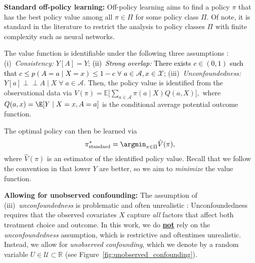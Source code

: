 \documentclass{article} %
\theoremstyle{plain}
\theoremstyle{definition}
\theoremstyle{remark}
\newcommand{\indep}{\perp \!\!\! \perp}
\newcommand{\rebuttal}[1]{\textcolor{black}{#1}}
\begin{document}
\textbf{Standard off-policy learning:} Off-policy learning aims to find a policy $\pi$ that has the best policy value among all $\pi \in \Pi$ for some policy class $\Pi$. Of note, it is standard in the literature \citep{ Frauen.2024, Hatt.2022b,Kallus.2018c} to restrict the analysis to policy classes $\Pi$ with finite complexity such as neural networks. 

The value function is identifiable under the following three assumptions \citep{Rubin.1978}: 
(i)~\emph{Consistency:} $Y[A]=Y$; \rebuttal{(ii)~\emph{Strong overlap:} There exists $c\in(0,1)$ such that $c \leq p(A=a \mid X=x)\leq 1-c \;\forall \; a\in \mathcal{A},x\in \mathcal{X}$;} (iii)~\emph{Unconfoundedness:} $Y[a]\indep A \mid X \;\forall \; a \in \mathcal{A}$. Then, the policy value is identified from the observational data via
   $V(\pi) = \mathbb{E}\Big[\sum_{a\in\mathcal{A}} \pi(a\mid X) Q(a,X)\Big],$
where $Q(a,x) = \E[Y \mid X=x, A = a]$ is the {conditional average potential outcome} function. 

The optimal policy can then be learned via
\begin{align}\label{eq:pstar_naive}
    \pi_{\text{standard}}^* = \argmin_{\pi \in \Pi} \hat{V}(\pi),%
\end{align}
where $\hat{V}(\pi)$ is an estimator of the identified policy value. Recall that we follow the convention in \citep{Kallus.2018c, Kallus.2021d} that lower $Y$ are better, so we aim to \emph{minimize} the value function.



\textbf{Allowing for unobserved confounding:} The assumption of (iii)~\emph{unconfoundedness} is problematic and often unrealistic \citep{Hemkens.2018}: Unconfoundedness requires that the observed covariates $X$ capture \emph{all} factors that affect both treatment choice and outcome. In this work, we do \textbf{\underline{not}} rely on the \emph{unconfoundedness} assumption, which is restrictive and oftentimes unrealistic. Instead, we allow for \emph{unobserved confounding}, which we denote by a random variable $U\in\mathcal{U}\subset\mathbb{R}$ (see Figure~\ref{fig:unobserved_confounding}).
\end{document}
